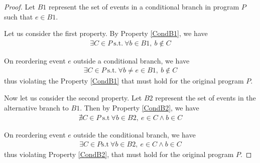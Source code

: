         \begin{proof}
            
            Let $B1$ represent the set of events in a conditional branch in program $P$ such that $e \in B1$. 
            
            Let us consider the first property. 
            By Property \ref{CondB1}, we have 
            \begin{align*}
                \exists C \in P \ \text{s.t.} \ \forall b \in B1, \ b \notin C
            \end{align*}

            On reordering event $e$ outside a conditional branch, we have 
            \begin{align*}
                \exists C \in P \ \text{s.t.} \ \forall b\!\neq\! e \in B1, \ b \notin C
            \end{align*}
            thus violating the Property \ref{CondB1} that must hold for the original program $P$.

            Now let us consider the second property. 
            Let $B2$ represent the set of events in the alternative branch to $B1$. 
            Then by Property \ref{CondB2}, we have 
            \begin{align*}
                \nexists C \in P \ \text{s.t} \ \forall b\!\in\!B2, \ e \in C \wedge b \in C
            \end{align*}

            On reordering event $e$ outside the conditional branch, we have 
            \begin{align*}
                \exists C \in P \text{s.t} \ \forall b\!\in\!B2, \ e \in C \wedge b \in C
            \end{align*}
            thus violating Property \ref{CondB2}, that must hold for the original program $P$.

        \end{proof}

